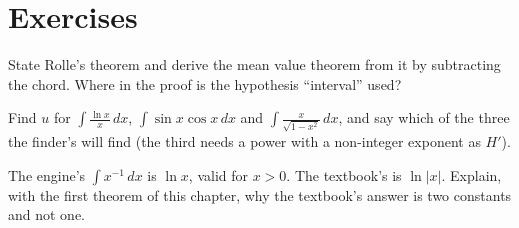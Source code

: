 \section{Exercises}

\begin{exercisebox}
  State Rolle's theorem and derive the mean value theorem from it by subtracting the chord.
  Where in the proof is the hypothesis ``interval'' used?
\end{exercisebox}

\begin{exercisebox}
  Find $u$ for $\int \frac{\ln x}{x}\,dx$, $\int \sin x \cos x\,dx$ and
  $\int \frac{x}{\sqrt{1 - x^2}}\,dx$, and say which of the three the finder's 
  will find (the third needs a power with a non-integer exponent as $H'$).
\end{exercisebox}

\begin{exercisebox}
  The engine's $\int x^{-1}\,dx$ is $\ln x$, valid for $x > 0$. The textbook's is $\ln|x|$.
  Explain, with the first theorem of this chapter, why the textbook's answer is two constants
  and not one.
\end{exercisebox}
